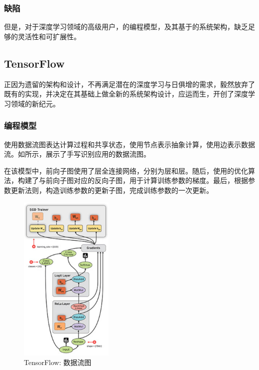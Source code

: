 \begin{content}
\subsubsection{缺陷}


但是，对于深度学习领域的高级用户，的编程模型，及其基于的系统架构，缺乏足够的灵活性和可扩展性。

\begin{enum}
\end{enum}

\subsection{TensorFlow}

正因为遗留的架构和设计，不再满足潜在的深度学习与日俱增的需求，毅然放弃了既有的实现，并决定在其基础上做全新的系统架构设计，应运而生，开创了深度学习领域的新纪元。

\subsubsection{编程模型}


使用数据流图表达计算过程和共享状态，使用节点表示抽象计算，使用边表示数据流。如所示，展示了手写识别应用的数据流图。

在该模型中，前向子图使用了层全连接网络，分别为层和层。随后，使用的优化算法，构建了与前向子图对应的反向子图，用于计算训练参数的梯度。最后，根据参数更新法则，构造训练参数的更新子图，完成训练参数的一次更新。

\begin{figure}[H]
\centering
\includegraphics[width=0.4\textwidth]{figures/tf-dataflow.png}
\caption{TensorFlow: 数据流图}
 \label{fig:tf-dataflow}
\end{figure}


\end{content}
